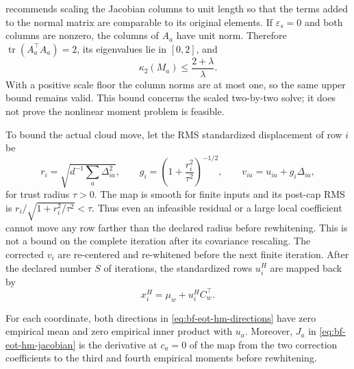 recommends scaling the Jacobian columns to unit length so that the terms added
to the normal matrix are comparable to its original elements.  If
\(\varepsilon_s=0\) and both columns are nonzero, the columns of \(A_a\) have
unit norm.  Therefore \(\operatorname{tr}(A_a^\top A_a)=2\), its eigenvalues
lie in \([0,2]\), and
\begin{equation}
 \kappa_2(M_a)\leq\frac{2+\lambda}{\lambda}.
 \label{eq:bf-eot-hm-scaled-lm-condition-bound}
\end{equation}
With a positive scale floor the column norms are at most one, so the same upper
bound remains valid.  This bound concerns the scaled two-by-two solve; it does
not prove the nonlinear moment problem is feasible.

To bound the actual cloud move, let the RMS standardized displacement of row
\(i\) be
\begin{equation}
 r_i=\sqrt{d^{-1}\sum_a\Delta_{ia}^2},
 \qquad
 g_i=\left(1+\frac{r_i^2}{\tau^2}\right)^{-1/2},
 \qquad
 v_{ia}=u_{ia}+g_i\Delta_{ia},
 \label{eq:bf-eot-hm-smooth-trust-cap}
\end{equation}
for trust radius \(\tau>0\).  The map is smooth for finite inputs and its
post-cap RMS is \(r_i/\sqrt{1+r_i^2/\tau^2}<\tau\).  Thus even an infeasible
residual or a large local coefficient cannot move any row farther than the
declared radius before rewhitening.  This is not a bound on the complete
iteration after its covariance rescaling.  The corrected \(v_i\) are re-centered and
re-whitened before the next finite iteration.  After the declared number \(S\)
of iterations, the standardized rows \(u_i^H\) are mapped back by
\begin{equation}
 x_i^H=\mu_w+u_i^H C_w^\top.
 \label{eq:bf-eot-hm-map-back}
\end{equation}

\begin{proposition}
\label{prop:bf-eot-hm-projected-jacobian}
For each coordinate, both directions in
\eqref{eq:bf-eot-hm-directions} have zero empirical mean and zero empirical
inner product with \(u_a\).  Moreover, \(J_a\) in
\eqref{eq:bf-eot-hm-jacobian} is the derivative at \(c_a=0\) of the map from
the two correction coefficients to the third and fourth empirical moments
before rewhitening.
\end{proposition}

